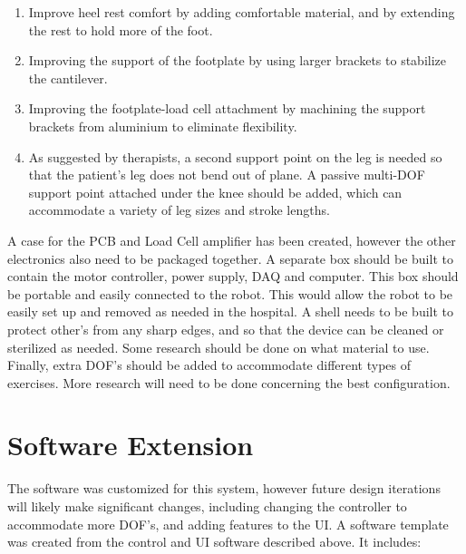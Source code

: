 \documentclass[12pt]{report}
\begin{document}
	\begin{enumerate}
		\item Improve heel rest comfort by adding comfortable material, and by extending the rest to hold more of the foot. 
		\item Improving the support of the footplate by using larger brackets to stabilize the cantilever. 
		\item Improving the footplate-load cell attachment by machining the support brackets from aluminium to eliminate flexibility. 
		\item As suggested by therapists, a second support point on the leg is needed so that the patient's leg does not bend out of plane. A passive multi-DOF support point attached under the knee should be added, which can accommodate a variety of leg sizes and stroke lengths. 
	\end{enumerate}		
	
	A case for the PCB and Load Cell amplifier has been created, however the other electronics also need to be packaged together. A separate box should be built to contain the motor controller, power supply, DAQ and computer. This box should be portable and easily connected to the robot. This would allow the robot to be easily set up and removed as needed in the hospital. A shell needs to be built to protect other's from any sharp edges, and so that the device can be cleaned or sterilized as needed. Some research should be done on what material to use. Finally, extra DOF's should be added to accommodate different types of exercises. More research will need to be done concerning the best configuration. 

		\section{Software Extension}
	
			
	The software was customized for this system, however future design iterations will likely make significant changes, including changing the controller to accommodate more DOF's, and adding features to the UI. A software template was created from the control and UI software described above. It includes:
	
\end{document}
